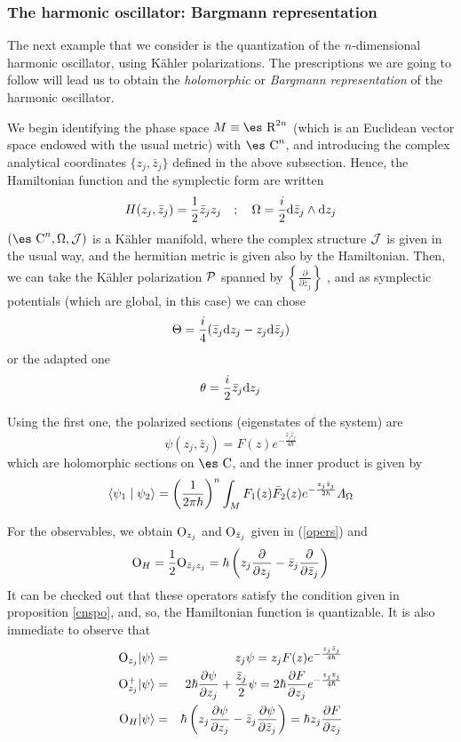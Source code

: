 \documentclass[12pt]{article}
\theoremstyle{plain}
\def\beann{\begin{eqnarray*}}
\def\eeann{\end{eqnarray*}}
\def\dst{\(}
\def\derpar#1#2{\frac{\partial{#1}}{\partial{#2}}}
\def\d{{\rm d}}
\def\P{{\cal P}}
\def\sta{|\psi \rangle }
\def\Op{{\rm O}}
\def\Real{\mbox{\es R}}
\def\Complex{\mbox{\es C}}
\def\LF{{\mit\Lambda}_{\Omega}}
\begin{document}
\subsubsection{The harmonic oscillator: Bargmann representation}


The next example that we consider
is the quantization of the $n$-dimensional harmonic oscillator,
using K\"ahler polarizations.
The prescriptions we are going to follow
will lead us to obtain the
{\it holomorphic} or {\it Bargmann representation}
of the harmonic oscillator.

We begin  identifying the phase space
$M \equiv \Real^{2n}$
(which is an Euclidean vector space endowed with the usual metric)
with $\Complex^n$,
and introducing the complex analytical coordinates
$\{ z_j, \bar z_j \}$
defined in the above subsection.
Hence, the Hamiltonian function
and the symplectic form are written
$$
H(z_j,\bar z_j)=\frac{1}{2}\bar z_j z_j
\quad ; \quad
\Omega=\frac{i}{2} \d \bar z_j \wedge \d z_j
$$
$(\Complex^n ,\Omega ,{\cal J})$ is a K\"ahler manifold,
where the complex structure ${\cal J}$ is given in the usual way,
and the hermitian metric is given also by the Hamiltonian.
Then, we can take the K\"ahler polarization $\P$ spanned by
\dst\left\{ \derpar{}{\bar z_j} \right\}\) , and as symplectic
potentials
(which are global, in this case)
we can chose
$$
\Theta = \frac{i}{4}(\bar z_j \d z_j - z_j \d \bar z_j)
$$
or the adapted one
$$
\theta = \frac{i}{2}\bar z_j\d z_j
$$

Using the first one, the polarized sections
(eigenstates of the system) are
$$
\psi (z_j,\bar z_j) = F(z) e^{-\frac{z_j \bar z_j}{4\hbar}}
$$
which are holomorphic sections on $\Complex$,
and the inner product is given by
$$
\langle \psi_1 \mid \psi_2\rangle  =\left( \frac{1}{2\pi \hbar}
\right)^n
\int_M F_1(z)\bar F_2(z) e^{-\frac{z_j\bar z_j}{2\hbar}}\LF
$$

For the observables, we obtain
$\Op_{z_j}$ and $\Op_{\bar z_j}$ given in
(\ref{opers}) and
$$
\Op_H = \frac{1}{2}\Op_{\bar z_j z_j} =
\hbar \left( z_j\derpar{}{z_j}-\bar z_j \derpar{}{\bar z_j} \right)
$$
It can be checked out that these operators
satisfy the condition given in proposition
\ref{cnspo}, and, so, the Hamiltonian function is quantizable.
It is also immediate to observe that
\beann
\Op_{z_j} \sta &=& z_j \psi = z_j F(z)e^{-\frac{z_j\bar z_j}{4\hbar}}
\\
\Op_{z_j}^+\sta &=& 2\hbar\derpar{\psi}{z_j}+\frac{\bar z_j}{2}\psi
= 2\hbar\derpar{F}{z_j}e^{-\frac{z_j\bar z_j}{4\hbar}}
\\
\Op_H\sta &=& \hbar\left( z_j\derpar{\psi}{z_j} -\bar
z_j\derpar{\psi}{\bar z_j}\right) = \hbar z_j \derpar{F}{z_j}
\eeann
\end{document}
